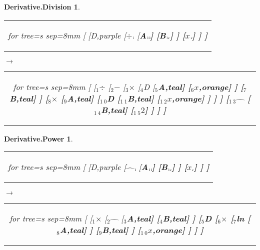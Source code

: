 \documentclass[UTF8,10pt]{ctexart}
\newcommand{\Bigskip}{\bigskip\medskip}
\newcommand{\subtreeA}{\bf A}
\newcommand{\subtreeB}{\bf B}
\newcommand{\I}{$_{\scriptscriptstyle 1}$}
\newcommand{\II}{$_{\scriptscriptstyle 2}$}
\newcommand{\III}{$_{\scriptscriptstyle 3}$}
\newcommand{\IV}{$_{\scriptscriptstyle 4}$}
\newcommand{\V}{$_{\scriptscriptstyle 5}$}
\newcommand{\VI}{$_{\scriptscriptstyle 6}$}
\newcommand{\VII}{$_{\scriptscriptstyle 7}$}
\newcommand{\VIII}{$_{\scriptscriptstyle 8}$}
\newcommand{\IX}{$_{\scriptscriptstyle 9}$}
\newcommand{\X}{$_{\scriptscriptstyle 1\:\!\!0}$}
\newcommand{\XI}{$_{\scriptscriptstyle 1\:\!\!1}$}
\newcommand{\XII}{$_{\scriptscriptstyle 1\:\!\!2}$}
\newcommand{\XIII}{$_{\scriptscriptstyle 1\:\!\!3}$}
\newcommand{\XIV}{$_{\scriptscriptstyle 1\:\!\!4}$}
\newcommand{\XV}{$_{\scriptscriptstyle 1\:\!\!5}$}
\newcommand{\lc}{$_{\:\!\scriptscriptstyle\rm l\!}$}
\newcommand{\rc}{$_{\:\!\scriptscriptstyle\rm r\!}$}
\newcommand{\Derivative}{\rm D}
\newcommand{\x}{$x$}
\newcommand{\Two}{$2$}
\newcommand{\Subtraction}{$-$}
\newcommand{\Multiplication}{$\times$}
\newcommand{\Division}{$\div$}
\newcommand{\Power}{$\hat{\quad}$}
\newcommand{\NaturalLogarithm}{\rm ln}
\newtheorem*{Derivative.Division}{\bf Derivative.Division }
\newtheorem*{Derivative.Power}{\bf Derivative.Power }
\begin{document}
	\begin{center}\vspace*{\fill}
		\begin{Derivative.Division}
			\qquad\par\Bigskip
			\begin{tabular}{c}
				\begin{forest}
					for tree={s sep=8mm}
					[
						[\Derivative,purple
							[\Division\lc
								[\subtreeA\lc\lc]
								[\subtreeB\lc\rc]
							]
							[\x\rc]
						]
					]
				\end{forest}
			\end{tabular}
			\qquad
			$\longrightarrow$
			\qquad
			\begin{tabular}{c}
				\begin{forest}
					for tree={s sep=8mm}
					[
						[\I\Division
							[\II\Subtraction
								[\III\Multiplication
									[\IV\Derivative
										[\V\subtreeA,teal]
										[\VI\x,orange]
									]
									[\VII\subtreeB,teal]
								]
								[\VIII\Multiplication
									[\IX\subtreeA,teal]
									[\X\Derivative
										[\XI\subtreeB,teal]
										[\XII\x,orange]
									]
								]
							]
							[\XIII\Power
								[\XIV\subtreeB,teal]
								[\XV\Two]
							]
						]
					]
				\end{forest}
			\end{tabular}
		\end{Derivative.Division}
		\bigskip
		\begin{Derivative.Power}
			\qquad\par\Bigskip
			\begin{tabular}{c}
				\begin{forest}
					for tree={s sep=8mm}
					[
						[\Derivative,purple
							[\Power\lc
								[\subtreeA\lc\lc]
								[\subtreeB\lc\rc]
							]
							[\x\rc]
						]
					]
				\end{forest}
			\end{tabular}
			\qquad
			$\longrightarrow$
			\qquad
			\begin{tabular}{c}
				\begin{forest}
					for tree={s sep=8mm}
					[
						[\I\Multiplication
							[\II\Power
								[\III\subtreeA,teal]
								[\IV\subtreeB,teal]
							]
							[\V\Derivative
								[\VI\Multiplication
									[\VII\NaturalLogarithm
										[\VIII\subtreeA,teal]
									]
									[\IX\subtreeB,teal]
								]
								[\X\x,orange]
							]
						]
					]
				\end{forest}
			\end{tabular}
		\end{Derivative.Power}
	\vspace*{\fill}\end{center}
\end{document}
